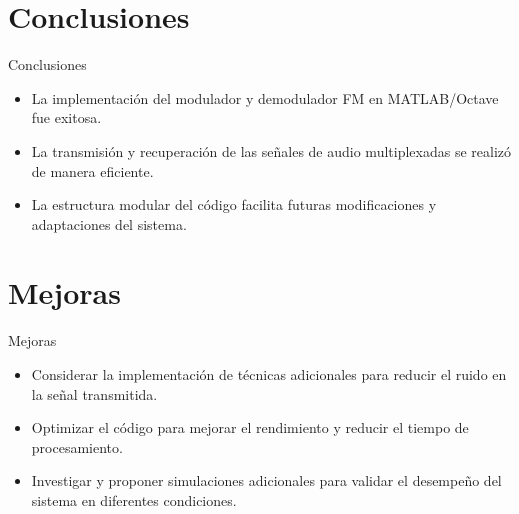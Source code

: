 \documentclass[mathserif,spanish]{beamer}
\begin{document}
\section{Conclusiones}
\begin{frame}{Conclusiones}
    \begin{itemize}
        \item La implementación del modulador y demodulador FM en MATLAB/Octave fue exitosa.
        \item La transmisión y recuperación de las señales de audio multiplexadas se realizó de manera eficiente.
        \item La estructura modular del código facilita futuras modificaciones y adaptaciones del sistema.
    \end{itemize}
\end{frame}

\section{Mejoras}
\begin{frame}{Mejoras}
    \begin{itemize}
        \item Considerar la implementación de técnicas adicionales para reducir el ruido en la señal transmitida.
        \item Optimizar el código para mejorar el rendimiento y reducir el tiempo de procesamiento.
        \item Investigar y proponer simulaciones adicionales para validar el desempeño del sistema en diferentes condiciones.
    \end{itemize}
\end{frame}
\end{document}
